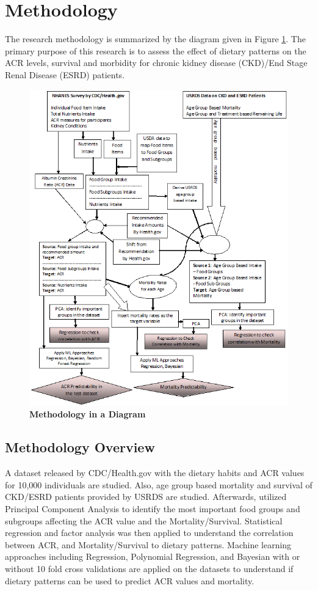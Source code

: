 \section{Methodology}
The research methodology is summarized by the diagram given in Figure \ref{methodology-new}. The primary purpose of this research is to assess the  effect of dietary patterns on the ACR levels, survival and morbidity for chronic kidney disease (CKD)/End Stage Renal Disease (ESRD) patients.

\begin{figure}
\centering
\includegraphics[scale=0.48]{./images/methodologies-enhanced}
\caption{\textbf{Methodology in a Diagram}}
\label{methodology-new}
\end{figure}

\subsection{Methodology Overview}
\noindent  A dataset released by CDC/Health.gov with the dietary habits and ACR values for 10,000 individuals are studied. Also, age group based mortality and survival of CKD/ESRD patients provided by USRDS are studied. Afterwards, utilized Principal Component Analysis to identify the most important food groups and subgroups affecting the ACR value and the Mortality/Survival.  Statistical regression and factor analysis was then applied to understand the correlation between ACR, and Mortality/Survival to dietary patterns. Machine learning approaches including Regression, Polynomial Regression, and Bayesian with or without 10 fold cross validations are applied on the datasets to understand if dietary patterns can be used to predict ACR values and mortality. 

